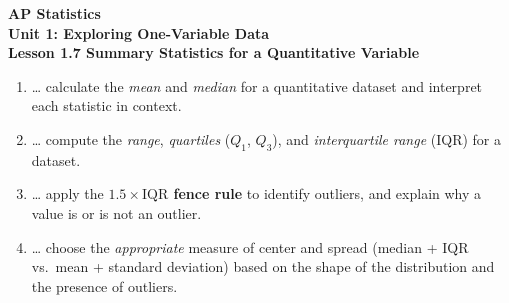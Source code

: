 \documentclass[10pt]{article}
\begin{document}
\vspace{-0.8in}

\begin{center}
  {\color{white}\textbf{\LARGE AP Statistics}}\\[4pt]
  {\color{skymid}\large\textbf{Unit 1: Exploring One-Variable Data}}\\[6pt]
  {\color{white}\textbf{\large Lesson 1.7 \quad Summary Statistics for a Quantitative Variable}}
\end{center}

\vspace{0.22in}

\namedateperiod

\vspace{0.18in}

\begin{learningtargetbox}
\small
\begin{enumerate}[leftmargin=1.5em, itemsep=5pt]
  \item \ldots{} calculate the \textit{mean} and \textit{median} for a quantitative
        dataset and interpret each statistic in context.
  \item \ldots{} compute the \textit{range}, \textit{quartiles} ($Q_1$, $Q_3$),
        and \textit{interquartile range} (IQR) for a dataset.
  \item \ldots{} apply the \textbf{$1.5 \times \text{IQR}$ fence rule} to identify
        outliers, and explain why a value is or is not an outlier.
  \item \ldots{} choose the \textit{appropriate} measure of center and spread
        (median + IQR vs.\ mean + standard deviation) based on the shape of the
        distribution and the presence of outliers.
\end{enumerate}
\end{learningtargetbox}

\vspace{0.14in}
\end{document}
